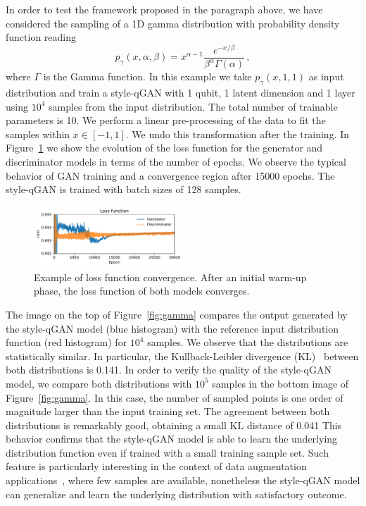 \documentclass[twocolumn,preprintnumbers,superscriptaddress]{revtex4-2}
\begin{document}
In order to test the framework proposed in the paragraph above, we have
considered the sampling of a 1D gamma distribution with probability density
function reading
\begin{equation}
  p_\gamma (x, \alpha, \beta) = x^{\alpha-1} \frac{e^{-x/\beta}}{\beta^\alpha \Gamma(\alpha)}\,,
\end{equation}
where $\Gamma$ is the Gamma function. In this example we take $p_\gamma (x, 1,
1)$ as input distribution and train a style-qGAN with 1 qubit, 1 latent dimension and
1 layer using $10^4$ samples from the input distribution. The total number of trainable parameters is 10. We perform a linear pre-processing of the data to fit the samples within $x \in [-1, 1]$. We undo this transformation after the training.
%
In Figure~\ref{fig:loss} we show the evolution of the loss function for the
generator and discriminator models in terms of the number of epochs. We observe the
typical behavior of GAN training and a convergence region after 15000 epochs.
%
The style-qGAN is trained with batch sizes of 128 samples.

\begin{figure}
  \includegraphics[width=0.5\textwidth]{plots/1Dgamma/1Dgamma_loss.pdf}
  \caption{\label{fig:loss}Example of loss function convergence. After an
  initial warm-up phase, the loss function of both models converges.}
\end{figure}

The image on the top of Figure~\ref{fig:gamma} compares the output generated by
the style-qGAN model (blue histogram) with the reference input distribution function
(red histogram) for $10^4$ samples. We observe that the distributions are
statistically similar. In particular, the Kullback-Leibler divergence
(KL)~\cite{kullback1951information} between both distributions is 0.141.
%
In order to verify the quality of the style-qGAN model, we compare both distributions
with $10^5$ samples in the bottom image of Figure~\ref{fig:gamma}. In this case,
the number of sampled points is one order of magnitude larger than the input
training set. The agreement between both distributions is remarkably good,
obtaining a small KL distance of 0.041
%
This behavior confirms that the style-qGAN model is able to learn the underlying
distribution function even if trained with a small training sample set. Such
feature is particularly interesting in the context of data augmentation
applications~\cite{frid2018synthetic,tanaka2019data}, where few samples are
available, nonetheless the style-qGAN model can generalize and learn the underlying distribution
with satisfactory outcome.
\end{document}

